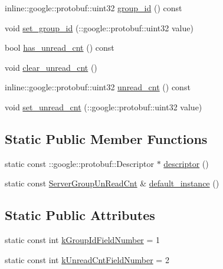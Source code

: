 \begin{DoxyCompactItemize}
\item 
inline\+::google\+::protobuf\+::uint32 \hyperlink{class_i_m_1_1_base_define_1_1_server_group_un_read_cnt_a50ecdc0325cc75907b7a16dd91269591}{group\+\_\+id} () const 
\item 
void \hyperlink{class_i_m_1_1_base_define_1_1_server_group_un_read_cnt_aaae5353e5445332e907735300ca41805}{set\+\_\+group\+\_\+id} (\+::google\+::protobuf\+::uint32 value)
\item 
bool \hyperlink{class_i_m_1_1_base_define_1_1_server_group_un_read_cnt_acb420ce8e7f07cef46f93728a91010fa}{has\+\_\+unread\+\_\+cnt} () const 
\item 
void \hyperlink{class_i_m_1_1_base_define_1_1_server_group_un_read_cnt_a54c73eb96ef20a63da4acbdf91ad3ea7}{clear\+\_\+unread\+\_\+cnt} ()
\item 
inline\+::google\+::protobuf\+::uint32 \hyperlink{class_i_m_1_1_base_define_1_1_server_group_un_read_cnt_a7a09dac70ae02bacca170c7de80be38c}{unread\+\_\+cnt} () const 
\item 
void \hyperlink{class_i_m_1_1_base_define_1_1_server_group_un_read_cnt_a13fd4a7f14b647a46ed3e72e5d806513}{set\+\_\+unread\+\_\+cnt} (\+::google\+::protobuf\+::uint32 value)
\end{DoxyCompactItemize}
\subsection*{Static Public Member Functions}
\begin{DoxyCompactItemize}
\item 
static const \+::google\+::protobuf\+::\+Descriptor $\ast$ \hyperlink{class_i_m_1_1_base_define_1_1_server_group_un_read_cnt_a48b9899ad9fdbe490048066b41849653}{descriptor} ()
\item 
static const \hyperlink{class_i_m_1_1_base_define_1_1_server_group_un_read_cnt}{Server\+Group\+Un\+Read\+Cnt} \& \hyperlink{class_i_m_1_1_base_define_1_1_server_group_un_read_cnt_a78163e46851a1dd040c60f5c673d3e61}{default\+\_\+instance} ()
\end{DoxyCompactItemize}
\subsection*{Static Public Attributes}
\begin{DoxyCompactItemize}
\item 
static const int \hyperlink{class_i_m_1_1_base_define_1_1_server_group_un_read_cnt_a2025f541e4b3f6ec0d7b2c62ac19f5ae}{k\+Group\+Id\+Field\+Number} = 1
\item 
static const int \hyperlink{class_i_m_1_1_base_define_1_1_server_group_un_read_cnt_ad0974713cc6a6349c3375b7ba01dc711}{k\+Unread\+Cnt\+Field\+Number} = 2
\end{DoxyCompactItemize}
